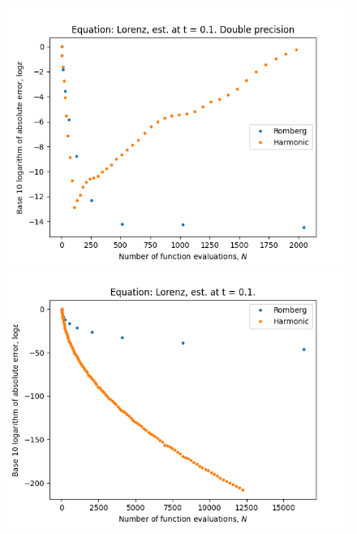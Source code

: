 \begin{figure}[H]
\centering
\begin{minipage}{0.45\textwidth}
\centering
\includegraphics[scale=0.45]{../results/emr_plots/lorenz.png}
\end{minipage}
\begin{minipage}{0.45\textwidth}
\centering
\includegraphics[scale=0.45]{../results/emr_plots/lorenz_hp.png}
\end{minipage}
\end{figure}

